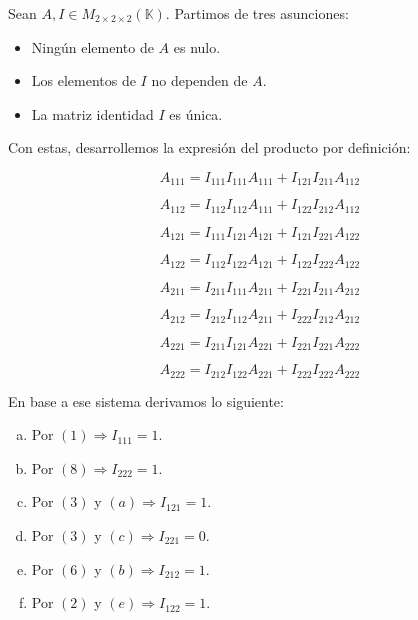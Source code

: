 \documentclass[a4paper, titlepage]{article}
\begin{document}
Sean $A, I \in M_{2\times 2\times 2} (\mathbb{K})$. Partimos de tres asunciones:

\begin{itemize}
	\item Ningún elemento de $A$ es nulo.
	\item Los elementos de $I$ no dependen de $A$.
	\item La matriz identidad $I$ es única.
\end{itemize}

Con estas, desarrollemos la expresión del producto por definición:

\begin{equation}
A_{111} = I_{111} I_{111} A_{111} + I_{121} I_{211} A_{112}
\end{equation}

\begin{equation}
A_{112} = I_{112} I_{112} A_{111} + I_{122} I_{212} A_{112}
\end{equation}

\begin{equation}
A_{121} = I_{111} I_{121} A_{121} + I_{121} I_{221} A_{122}
\end{equation}

\begin{equation}
A_{122} = I_{112} I_{122} A_{121} + I_{122} I_{222} A_{122}
\end{equation}

\begin{equation}
A_{211} = I_{211} I_{111} A_{211} + I_{221} I_{211} A_{212}
\end{equation}

\begin{equation}
A_{212} = I_{212} I_{112} A_{211} + I_{222} I_{212} A_{212}
\end{equation}

\begin{equation}
A_{221} = I_{211} I_{121} A_{221} + I_{221} I_{221} A_{222}
\end{equation}

\begin{equation}
A_{222} = I_{212} I_{122} A_{221} + I_{222} I_{222} A_{222}
\end{equation}

En base a ese sistema derivamos lo siguiente:

\begin{enumerate}[(a)]
	\item Por $(1) \Rightarrow I_{111} = 1$.
	\item Por $(8) \Rightarrow I_{222} = 1$.
	\item Por $(3)$ y $(a) \Rightarrow I_{121} = 1$.
	\item Por $(3)$ y $(c) \Rightarrow I_{221} = 0$.
	\item Por $(6)$ y $(b) \Rightarrow I_{212} = 1$.
	\item Por $(2)$ y $(e) \Rightarrow I_{122} = 1$.
\end{enumerate}
\end{document}
